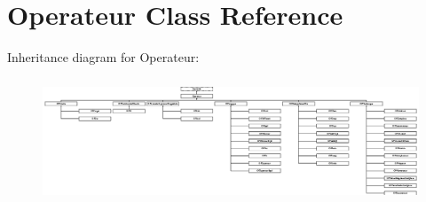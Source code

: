 \hypertarget{class_operateur}{}\section{Operateur Class Reference}
\label{class_operateur}
Inheritance diagram for Operateur\+:\begin{figure}[H]
\begin{center}
\leavevmode
\includegraphics[height=3.725055cm]{class_operateur}
\end{center}
\end{figure}
